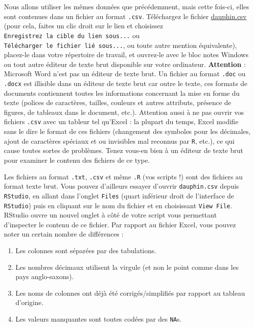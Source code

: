 \documentclass[
  letterpaper,
  DIV=11,
  numbers=noendperiod]{scrreprt}
\providecommand{\tightlist}{%
  \setlength{\itemsep}{0pt}\setlength{\parskip}{0pt}}\usepackage{longtable,booktabs,array}
\begin{document}
Nous allons utiliser les mêmes données que précédemment, mais cette
fois-ci, elles sont contenues dans un fichier au format \texttt{.csv}.
Téléchargez le fichier \href{data/dauphin.csv}{dauphin.csv} (pour cela,
faites un clic droit sur le lien et choisissez
\texttt{Enregistrez\ la\ cible\ du\ lien\ sous...} ou
\texttt{Télécharger\ le\ fichier\ lié\ sous...}, ou toute autre mention
équivalente), placez-le dans votre répertoire de travail, et ouvrez-le
avec le bloc notes Windows ou tout autre éditeur de texte brut
disponible sur votre ordinateur. \textbf{Attention} : Microsoft Word
n'est pas un éditeur de texte brut. Un fichier au format \texttt{.doc}
ou \texttt{.docx} est illisible dans un éditeur de texte brut car outre
le texte, ces formats de documents contiennent toutes les informations
concernant la mise en forme du texte (polices de caractères, tailles,
couleurs et autres attributs, présence de figures, de tableaux dans le
document, etc.). Attention aussi à ne pas ouvrir vos fichiers
\texttt{.csv} avec un tableur tel qu'Excel : la plupart du temps, Excel
modifie sans le dire le format de ces fichiers (changement des symboles
pour les décimales, ajout de caractères spéciaux et ou invisibles mal
reconnus par \texttt{R}, etc.), ce qui cause toutes sortes de problèmes.
Tenez vous-en bien à un éditeur de texte brut pour examiner le contenu
des fichiers de ce type.

Les fichiers au format \texttt{.txt}, \texttt{.csv} et même \texttt{.R}
(vos scripts !) sont des fichiers au format texte brut. Vous pouvez
d'ailleurs essayer d'ouvrir \texttt{dauphin.csv} depuis
\texttt{RStudio}, en allant dans l'onglet \texttt{Files} (quart
inférieur droit de l'interface de \texttt{RStudio}) puis en cliquant sur
le nom du fichier et en choisissant \texttt{View\ File}. RStudio ouvre
un nouvel onglet à côté de votre script vous permettant d'inspecter le
contenu de ce fichier. Par rapport au fichier Excel, vous pouvez noter
un certain nombre de différences :

\begin{enumerate}
\def\labelenumi{\arabic{enumi}.}
\tightlist
\item
  Les colonnes sont séparées par des tabulations.
\item
  Les nombres décimaux utilisent la virgule (et non le point comme dans
  les pays anglo-saxons).
\item
  Les noms de colonnes ont déjà été corrigés/simplifiés par rapport au
  tableau d'origine.
\item
  Les valeurs manquantes sont toutes codées par des \texttt{NA}s.
\end{enumerate}
\end{document}
